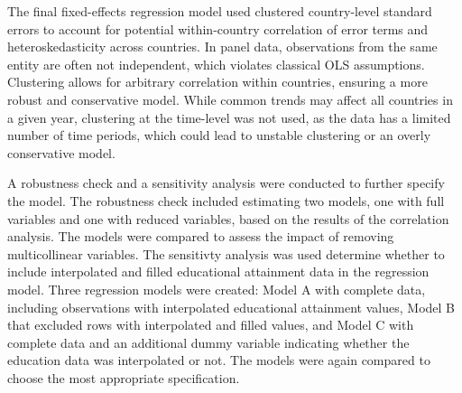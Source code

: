 The final fixed-effects regression model used clustered country-level standard errors to 
account for potential within-country correlation of error terms and heteroskedasticity across 
countries. In panel data, observations from the same entity are often not independent, which 
violates classical OLS assumptions. Clustering allows for arbitrary correlation within 
countries, ensuring a more robust and conservative model. While common trends may 
affect all countries in a given year, clustering at the time-level was not used, as 
the data has a limited number of time periods, which could lead to unstable clustering 
or an overly conservative model.

A robustness check and a sensitivity analysis were conducted to further specify the model.
The robustness check included estimating two models, one with full variables and one with 
reduced variables, based on the results of the correlation analysis. The models were 
compared to assess the impact of removing multicollinear variables.
The sensitivty analysis was used determine whether to include interpolated and filled educational 
attainment data in the regression model. Three regression models were created: Model A with 
complete data, including observations with interpolated educational attainment values, Model B 
that excluded rows with interpolated and filled values, and Model C with complete data and an additional 
dummy variable indicating whether the education data was interpolated or not. The models 
were again compared to choose the most appropriate specification.